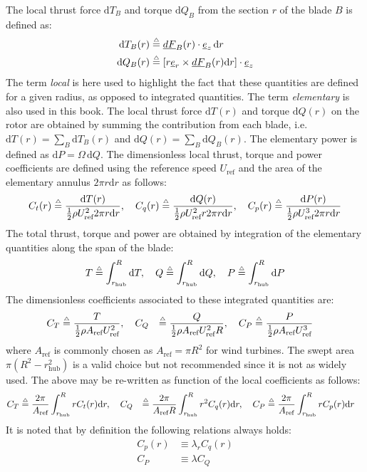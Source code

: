 \documentclass[11pt]{article}
\renewcommand{\d}{\mathrm{d}}
\newcommand{\dr}{{\d}r}
\newcommand{\dQ}{{\d}Q}
\newcommand{\dP}{{\d}P}
\newcommand{\dT}{{\d}T}
\newcommand{\eqdef}{\stackrel{\mathsmaller{\mathsmaller{\mathsmaller{\triangle}}}}{=}}
\renewcommand{\v}[1]{\underline{#1}}
\newcommand{\CTloc}{\ensuremath{C_{t}}}
\newcommand{\CPloc}{\ensuremath{C_{p}}}
\newcommand{\CQloc}{\ensuremath{C_{q}}}
\begin{document}
The local thrust force $\dT_{B}$ and torque $\dQ_{B}$ from the section $r$ of the blade $B$ is defined as:
%
\begin{align}
    \dT_{B}(r)&\eqdef \v{dF}_B(r)\cdot \v{e}_z\, \dr  \\ %
    \dQ_{B}(r)&\eqdef \left[ r\v{e}_r\times \v{dF}_B(r) \dr \right] \cdot \v{e}_z %
\end{align}
The term \emph{local} is here used to highlight the fact that these quantities are defined for a given radius, as opposed to integrated quantities. The term \emph{elementary} is also used in this book.
%
The local thrust force $\dT(r)$ and torque $\dQ(r)$ on the rotor are obtained by summing the contribution from each blade, i.e. $\dT(r)=\sum_B \dT_B(r)$ and $\dQ(r)=\sum_B \dQ_B(r)$. The elementary power is defined as $\dP=\Omega\,\dQ$. The dimensionless local thrust, torque and power coefficients are defined using the reference speed $U_\text{ref}$ and the area of the elementary annulus $2\pi r \dr$ as follows:
\begin{align}
    {\CTloc}(r)\eqdef\frac{\dT(r)}{\frac{1}{2}\rho U_\text{ref}^2 2\pi r \dr}, \quad
    {\CQloc}(r)\eqdef\frac{\dQ(r)}{\frac{1}{2}\rho U_\text{ref}^2 r 2 \pi r \dr}  ,\quad
    {\CPloc}(r)\eqdef\frac{\dP(r)}{\frac{1}{2}\rho U_\text{ref}^3 2 \pi r \dr} 
    \label{eq:CtCqCpDef}
\end{align}
The total thrust, torque and power are obtained by integration of the elementary quantities along the span of the blade:
\begin{alignat}{3}
    T\eqdef \int_{r_\text{hub}}^R \dT, \quad
    Q\eqdef \int_{r_\text{hub}}^R \dQ, \quad
    P\eqdef \int_{r_\text{hub}}^R \dP
\end{alignat}
The dimensionless coefficients associated to these integrated quantities are:
\begin{alignat}{4}
    C_{T}&\eqdef \frac{T}{\frac{1}{2} \rho A_\text{ref} U_\text{ref}^2}, \quad
    C_{Q}&\eqdef \frac{Q}{\frac{1}{2} \rho A_\text{ref} U_\text{ref}^2 R},\quad
    C_{P}&\eqdef \frac{P}{\frac{1}{2} \rho A_\text{ref} U_\text{ref}^3 } 
    \label{eq:CTCQCPDefBase}
\end{alignat}
where $A_\text{ref}$ is commonly chosen as $A_\text{ref}=\pi R^2$ for wind turbines. The swept area $\pi (R^2-r_\text{hub}^2)$ is a valid choice but not recommended since it is not as widely used.
% 
The above may be re-written as function of the local coefficients as follows:
\begin{alignat}{4}
    C_{T}&\eqdef \frac{2\pi}{A_\text{ref}}\int_{r_\text{hub}}^R r   \CTloc(r) \dr, \quad
    C_{Q}&\eqdef \frac{2\pi}{A_\text{ref}R}\int_{r_\text{hub}}^R r^2 \CQloc(r) \dr,\quad
    C_{P}&\eqdef \frac{2\pi}{A_\text{ref}}\int_{r_\text{hub}}^R r   \CPloc(r) \dr 
    \label{eq:CTCQCPDef}
\end{alignat}
It is noted that by definition the following relations always holds:
\begin{align}
    \CPloc(r) &\equiv \lambda_r \CQloc(r) \label{eq:GeneralRelationsCpCq}\\
    C_P       &\equiv \lambda C_Q \label{eq:GeneralRelationsCPCQ}
\end{align}
%
\end{document}
